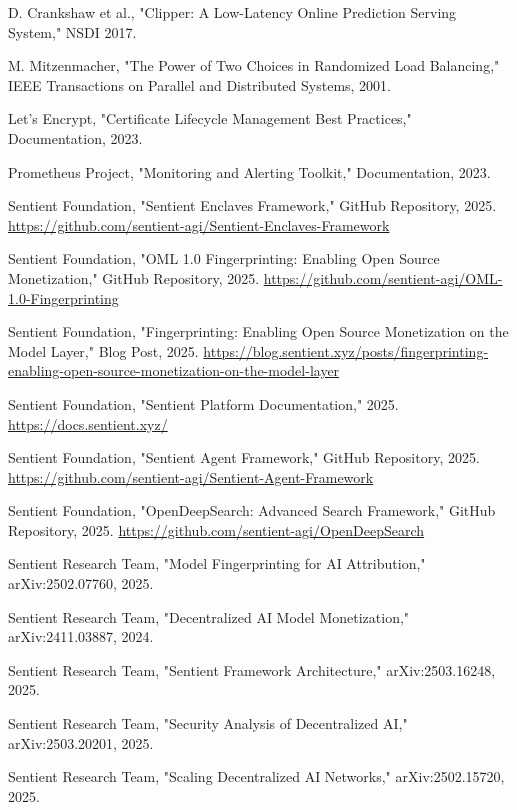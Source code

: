 \documentclass[12pt,a4paper]{article}
\begin{document}
\begin{thebibliography}{99}
D. Crankshaw et al., "Clipper: A Low-Latency Online Prediction Serving System," NSDI 2017.

M. Mitzenmacher, "The Power of Two Choices in Randomized Load Balancing," IEEE Transactions on Parallel and Distributed Systems, 2001.

Let's Encrypt, "Certificate Lifecycle Management Best Practices," Documentation, 2023.

Prometheus Project, "Monitoring and Alerting Toolkit," Documentation, 2023.

Sentient Foundation, "Sentient Enclaves Framework," GitHub Repository, 2025. \url{https://github.com/sentient-agi/Sentient-Enclaves-Framework}

Sentient Foundation, "OML 1.0 Fingerprinting: Enabling Open Source Monetization," GitHub Repository, 2025. \url{https://github.com/sentient-agi/OML-1.0-Fingerprinting}

Sentient Foundation, "Fingerprinting: Enabling Open Source Monetization on the Model Layer," Blog Post, 2025. \url{https://blog.sentient.xyz/posts/fingerprinting-enabling-open-source-monetization-on-the-model-layer}

Sentient Foundation, "Sentient Platform Documentation," 2025. \url{https://docs.sentient.xyz/}

Sentient Foundation, "Sentient Agent Framework," GitHub Repository, 2025. \url{https://github.com/sentient-agi/Sentient-Agent-Framework}

Sentient Foundation, "OpenDeepSearch: Advanced Search Framework," GitHub Repository, 2025. \url{https://github.com/sentient-agi/OpenDeepSearch}

Sentient Research Team, "Model Fingerprinting for AI Attribution," arXiv:2502.07760, 2025.

Sentient Research Team, "Decentralized AI Model Monetization," arXiv:2411.03887, 2024.

Sentient Research Team, "Sentient Framework Architecture," arXiv:2503.16248, 2025.

Sentient Research Team, "Security Analysis of Decentralized AI," arXiv:2503.20201, 2025.

Sentient Research Team, "Scaling Decentralized AI Networks," arXiv:2502.15720, 2025.

\end{thebibliography}
\end{document}
